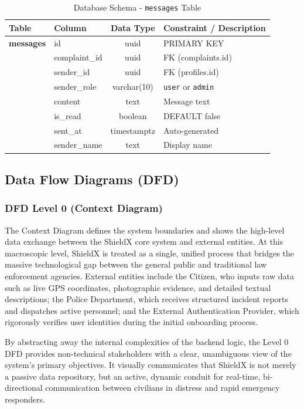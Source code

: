 \documentclass[12pt, a4paper, twoside, openany]{report}
\begin{document}
\begin{table}[ht]
\centering
\caption{Database Schema - \texttt{messages} Table}
\label{tab:messages}
\begin{tabularx}{\textwidth}{p{3cm} p{3cm} c X}
\toprule
\textbf{Table} & \textbf{Column} & \textbf{Data Type} & \textbf{Constraint / Description} \\
\midrule
\textbf{messages} & id & uuid & PRIMARY KEY \\
& complaint\_id & uuid & FK (complaints.id) \\
& sender\_id & uuid & FK (profiles.id) \\
& sender\_role & varchar(10) & \texttt{user} or \texttt{admin} \\
& content & text & Message text \\
& is\_read & boolean & DEFAULT false \\
& sent\_at & timestamptz & Auto-generated \\
& sender\_name & text & Display name \\
\bottomrule
\end{tabularx}
\end{table}



\subsection{Data Flow Diagrams (DFD)}

\subsubsection{DFD Level 0 (Context Diagram)}
The Context Diagram defines the system boundaries and shows the high-level data exchange between the ShieldX core system and external entities. At this macroscopic level, ShieldX is treated as a single, unified process that bridges the massive technological gap between the general public and traditional law enforcement agencies. External entities include the Citizen, who inputs raw data such as live GPS coordinates, photographic evidence, and detailed textual descriptions; the Police Department, which receives structured incident reports and dispatches active personnel; and the External Authentication Provider, which rigorously verifies user identities during the initial onboarding process.

By abstracting away the internal complexities of the backend logic, the Level 0 DFD provides non-technical stakeholders with a clear, unambiguous view of the system's primary objectives. It visually communicates that ShieldX is not merely a passive data repository, but an active, dynamic conduit for real-time, bi-directional communication between civilians in distress and rapid emergency responders. 
\end{document}
